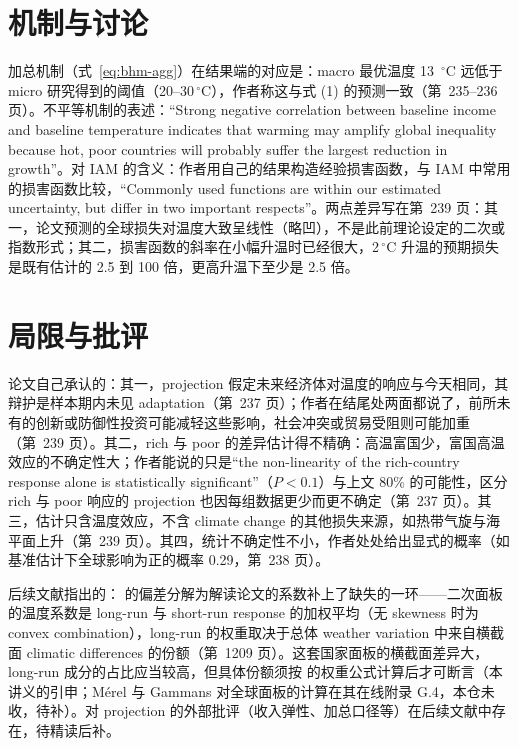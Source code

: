 \section{机制与讨论}

加总机制（式~\ref{eq:bhm-agg}）在结果端的对应是：macro 最优温度 13~$^\circ$C 远低于 micro 研究得到的阈值（20--30\,$^\circ$C），作者称这与式 (1) 的预测一致（第~235--236 页）。不平等机制的表述：``Strong negative correlation between baseline income and baseline temperature indicates that warming may amplify global inequality because hot, poor countries will probably suffer the largest reduction in growth''\citep[第~238 页]{burke2015global}。对 IAM 的含义：作者用自己的结果构造经验损害函数，与 IAM 中常用的损害函数比较，``Commonly used functions are within our estimated uncertainty, but differ in two important respects''\citep[第~238 页]{burke2015global}。两点差异写在第~239 页：其一，论文预测的全球损失对温度大致呈线性（略凹），不是此前理论设定的二次或指数形式；其二，损害函数的斜率在小幅升温时已经很大，2\,$^\circ$C 升温的预期损失是既有估计的 2.5 到 100 倍，更高升温下至少是 2.5 倍。

\section{局限与批评}

论文自己承认的：其一，projection 假定未来经济体对温度的响应与今天相同，其辩护是样本期内未见 adaptation（第~237 页）；作者在结尾处两面都说了，前所未有的创新或防御性投资可能减轻这些影响，社会冲突或贸易受阻则可能加重（第~239 页）。其二，rich 与 poor 的差异估计得不精确：高温富国少，富国高温效应的不确定性大；作者能说的只是``the non-linearity of the rich-country response alone is statistically significant''\citep[第~237 页]{burke2015global}（$P<0.1$）与上文 80\% 的可能性，区分 rich 与 poor 响应的 projection 也因每组数据更少而更不确定（第~237 页）。其三，估计只含温度效应，不含 climate change 的其他损失来源，如热带气旋与海平面上升（第~239 页）。其四，统计不确定性不小，作者处处给出显式的概率（如基准估计下全球影响为正的概率 0.29，第~238 页）。

后续文献指出的：\citet{merel2021climate} 的偏差分解为解读论文的系数补上了缺失的一环——二次面板的温度系数是 long-run 与 short-run response 的加权平均（无 skewness 时为 convex combination），long-run 的权重取决于总体 weather variation 中来自横截面 climatic differences 的份额（第~1209 页）。这套国家面板的横截面差异大，long-run 成分的占比应当较高，但具体份额须按  的权重公式计算后才可断言（本讲义的引申；Mérel 与 Gammans 对全球面板的计算在其在线附录 G.4，本仓未收，待补）。对 projection 的外部批评（收入弹性、加总口径等）在后续文献中存在，待精读后补。

